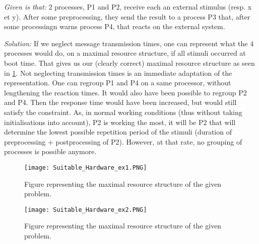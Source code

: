 \documentclass[../main.tex]{subfiles}
\begin{document}
\begin{exmp}
\emph{Given is that:} 2 processes, P1 and P2, receive each an external stimulus (resp. x et y). After some preprocessing, they send the result to a process P3 that, after some processingn warns process P4, that reacts on the external system. 

\emph{Solution:} If we neglect message transmission times, one can represent what the 4 processes would do, on a maximal resource structure, if all stimuli occurred at boot time.
That gives us our (clearly correct) maximal resource structure as seen in \ref{f:sh_ex1}.
Not neglecting transmission times is an immediate adaptation of the representation. One can regroup P1 and P4 on a same processor, without lengthening the reaction times. It would also have been possible to regroup P2 and P4. Then the response time would have been increased, but would still satisfy the constraint.
As, in normal working conditions (thus without taking initialisations into account), P2 is working the most, it will be P2 that will determine the lowest possible repetition period of the stimuli (duration of preprocessing + postprocessing of P2). However, at that rate, no grouping of processes is possible anymore.
\end{exmp}

\begin{figure}
	\texttt{[image: Suitable\_Hardware\_ex1.PNG]}
	\caption{Figure representing the maximal resource structure of the given problem.}
	\label{f:sh_ex1}
\end{figure}

\begin{figure}
	\texttt{[image: Suitable\_Hardware\_ex2.PNG]}
	\caption{Figure representing the maximal resource structure of the given problem.}
	\label{f:sh_ex2}
\end{figure}
\end{document}
